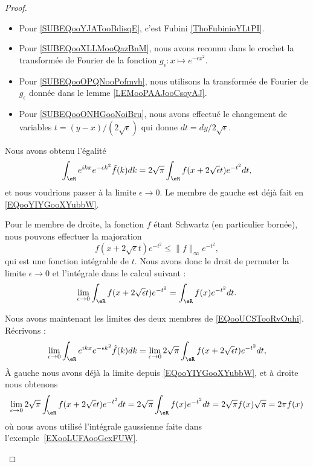 \begin{proof}
\begin{subproof}
\begin{subproof}
\begin{itemize}
				\item
				      Pour \eqref{SUBEQooYJATooBdisqE}, c'est Fubini \ref{ThoFubinioYLtPI}.
				\item
				      Pour \eqref{SUBEQooXLLMooQazBnM}, nous avons reconnu dans le crochet la transformée de Fourier de la fonction \( g_{\epsilon}\colon x\mapsto  e^{-\epsilon x^2}\).
				\item
				      Pour \eqref{SUBEQooOPQNooPofmvh}, nous utilisons la transformée de Fourier de \( g_{\epsilon}\) donnée dans le lemme \ref{LEMooPAAJooCsoyAJ}.
				\item
				      Pour \eqref{SUBEQooONHGooNoiBru}, nous avons effectué le changement de variables \( t=(y-x)/(2\sqrt{ \epsilon })\) qui donne \( dt=dy/2\sqrt{ \epsilon }\).
			\end{itemize}

		\end{subproof}


		Nous avons obtenu l'égalité
		\begin{equation}        \label{EQooUCSTooRvOuhi}
			\int_{\eR} e^{ikx} e^{-\epsilon k^2}\hat f(k)dk = 2\sqrt{ \pi }\int_{\eR}f(x+2\sqrt{ \epsilon }t) e^{-t^2}dt,
		\end{equation}
		et nous voudrions passer à la limite \( \epsilon\to 0\). Le membre de gauche est déjà fait en \eqref{EQooYIYGooXYubbW}.

		Pour le membre de droite, la fonction \( f\) étant Schwartz (en particulier bornée), nous pouvons effectuer la majoration
		\begin{equation}
			f(x+2\sqrt{ \epsilon }t) e^{-t^2}\leq \| f \|_{\infty} e^{-t^2},
		\end{equation}
		qui est une fonction intégrable de \( t\). Nous avons donc le droit de permuter la limite \( \epsilon\to 0\) et l'intégrale dans le calcul suivant :
		\begin{equation}
			\lim_{\epsilon\to 0}\int_{\eR}f(x+2\sqrt{ \epsilon }t) e^{-t^2}=\int_{\eR}f(x) e^{-t^2}dt.
		\end{equation}

		\spitem[Fin]

		Nous avons maintenant les limites des deux membres de \eqref{EQooUCSTooRvOuhi}. Récrivons :
		\begin{equation}
			\lim_{\epsilon\to 0}\int_{\eR} e^{ikx} e^{-\epsilon k^2}\hat f(k)dk =\lim_{\epsilon\to 0} 2\sqrt{ \pi }\int_{\eR}f(x+2\sqrt{ \epsilon }t) e^{-t^2}dt,
		\end{equation}
		À gauche nous avons déjà la limite depuis \eqref{EQooYIYGooXYubbW}, et à droite nous obtenons
		\begin{equation}
			\lim_{\epsilon\to 0} 2\sqrt{ \pi }\int_{\eR}f(x+2\sqrt{ \epsilon }t) e^{-t^2}dt=2\sqrt{ \pi }\int_{\eR}f(x) e^{-t^2}dt=2\sqrt{ \pi }f(x)\sqrt{ \pi }=2\pi f(x)
		\end{equation}
		où nous avons utilisé l'intégrale gaussienne faite dans l'exemple~\ref{EXooLUFAooGcxFUW}.


\end{subproof}
\end{proof}
